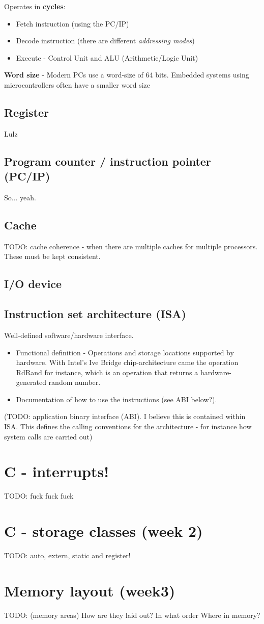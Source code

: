 \documentclass{article}
\begin{document}
Operates in \textbf{cycles}:
\begin{itemize}
	\item Fetch instruction (using the PC/IP)
	\item Decode instruction (there are different \emph{addressing modes})
	\item Execute - Control Unit and ALU (Arithmetic/Logic Unit)
\end{itemize}

\textbf{Word size} - Modern PCs use a word-size of 64 bits. Embedded systems using microcontrollers often have a smaller word size

\subsection*{Register}
Lulz

\subsection*{Program counter / instruction pointer (PC/IP)}
So... yeah.

\subsection*{Cache}
TODO: cache coherence - when there are multiple caches for multiple processors. These must be kept consistent.

\subsection*{I/O device}

\subsection*{Instruction set architecture (ISA)}
Well-defined software/hardware interface.

\begin{itemize}
	\item Functional definition - Operations and storage locations supported by hardware. With Intel's Ive Bridge chip-architecture came the operation RdRand for instance, which is an operation that returns a hardware-generated random number.
	\item Documentation of how to use the instructions (see ABI below?).
\end{itemize}

(TODO: application binary interface (ABI). I believe this is contained within ISA. This defines the calling conventions for the architecture - for instance how system calls are carried out)

\section*{C - interrupts!}
TODO: fuck fuck fuck


\section*{C - storage classes (week 2)}
TODO: auto, extern, static and register!


\section*{Memory layout (week3)}
TODO: (memory areas) How are they laid out? In what order Where in memory?
\end{document}
